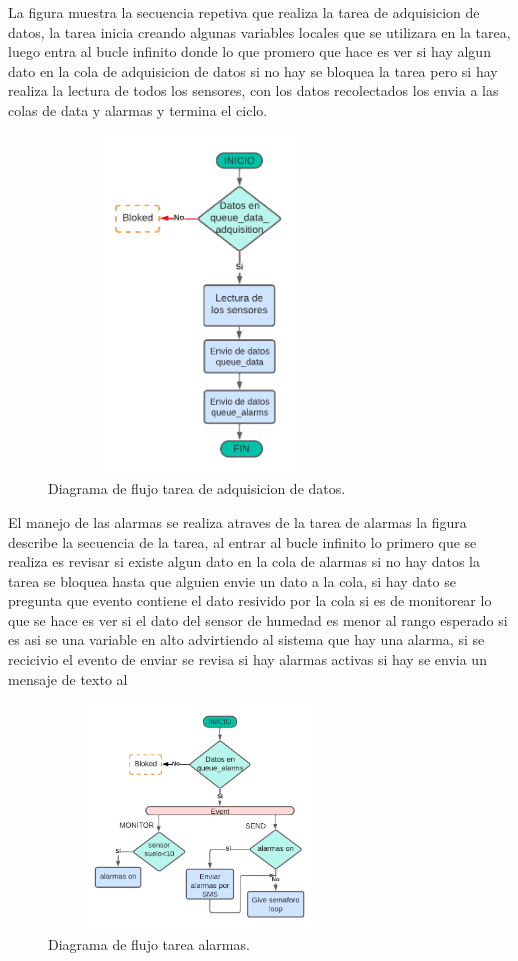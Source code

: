 \clearpage
La figura muestra la secuencia repetiva que realiza la tarea de adquisicion de datos, la tarea inicia creando algunas variables locales que se utilizara en la tarea, luego entra al bucle infinito donde lo que promero que hace es ver si hay algun dato en la cola de adquisicion de datos si no hay se bloquea la tarea pero si hay realiza la lectura de todos los sensores, con los datos recolectados los envia a las colas de data y alarmas y termina el ciclo.
\begin{figure}[htbp]
  \centering
	\includegraphics[width=8cm, height=9cm]{./Figures/DF task adquisicion.png}
	\caption{Diagrama de flujo tarea de adquisicion de datos.}
	\label{fig:Df tarea adquisicion}
\end{figure}

El manejo de las alarmas se realiza atraves de la tarea de alarmas la figura describe la secuencia de la tarea, 
al entrar al bucle infinito lo primero que se realiza es revisar si existe algun dato en la cola de alarmas si no hay datos la tarea se bloquea hasta que alguien envie un dato a la cola, si hay dato se pregunta que evento contiene el dato resivido por la cola si es de monitorear lo que se hace es ver si el dato del sensor de humedad es menor al rango esperado si es asi se una variable en alto advirtiendo al sistema que hay una alarma, si se recicivio el evento de enviar se revisa si hay alarmas activas si hay se envia un mensaje de texto al 

\begin{figure}[htbp]
  \centering
	\includegraphics[width=8cm, height=6cm]{./Figures/DF_alarms.png}
	\caption{Diagrama de flujo tarea alarmas.}
	\label{fig:Df tarea alarmas}
\end{figure}


